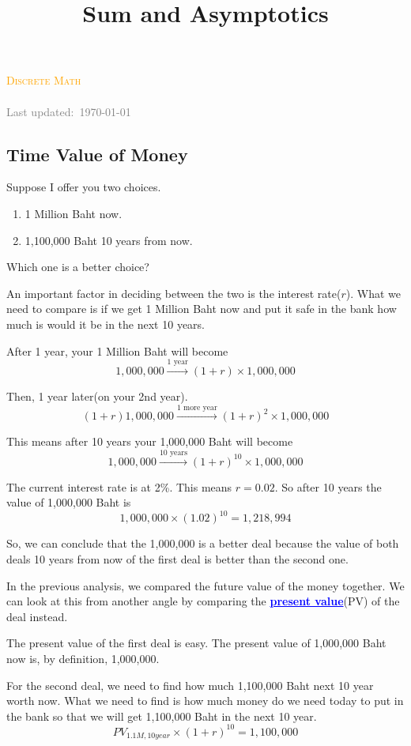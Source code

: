 \documentclass[a4paper, 12pt]{article}
\title{Sum and Asymptotics}
\newcommand{\kwd}[1]{\textcolor{blue}{\textbf{\underline{#1}}}}
\newcommand{\course}{Discrete Math}
\begin{document}
\begin{center}
	\textcolor{orange}{\textsc{\course}}\\
	\huge\textbf{\textsc{\thetitle}}\\
	\small\textcolor{gray}{Last updated:\, \today \, \currenttime}\\
\end{center}

\begin{multicols}{2}
\section*{Time Value of Money}
Suppose I offer you two choices.
\begin{enumerate}
	\item 1 Million Baht now.
	\item 1,100,000 Baht 10 years from now.
\end{enumerate}
Which one is a better choice?

An important factor in deciding between the two is the interest rate($r$). What we need to compare is if we get 1 Million Baht now and put it safe in the bank how much is would it be in the next 10 years.

After 1 year, your 1 Million Baht will become
\[
	1,000,000 \xrightarrow{\text{1 year}}	(1+r)\times 1,000,000
\]

Then, 1 year later(on your 2nd year).
\[
	(1+r)1,000,000 \xrightarrow{\text{1 more year}}	(1+r)^2\times 1,000,000
\]

This means after 10 years your 1,000,000 Baht will become
\[
1,000,000 \xrightarrow{\text{10 years}}	(1+r)^{10}\times 1,000,000
\]

The current interest rate is at 2\%. This means $r = 0.02$. So after 10 years the value of 1,000,000 Baht is
\[
1,000,000 \times (1.02)^{10} = 1,218,994
\]

So, we can conclude that the 1,000,000 is a better deal because the value of both deals 10 years from now of the first deal is better than the second one.

In the previous analysis, we compared the future value of the money together. We can look at this from another angle by comparing the \kwd{present value}(PV) of the deal instead.

The present value of the first deal is easy. The present value of 1,000,000 Baht now is, by definition, 1,000,000.

For the second deal, we need to find how much 1,100,000 Baht next 10 year worth now. What we need to find is how much money do we need today to put in the bank so that we will get 1,100,000 Baht in the next 10 year.
\[
	PV_{1.1M, 10year} \times (1+r)^{10} = 1,100,000
\]


\end{multicols}
\end{document}
